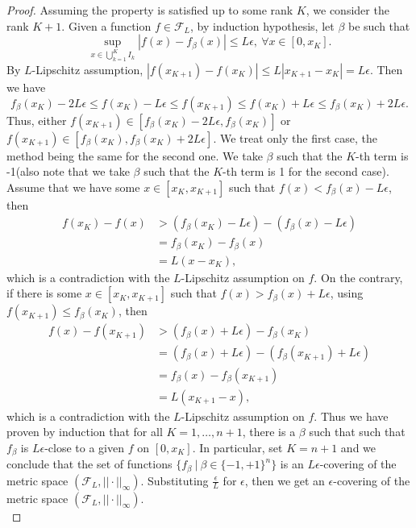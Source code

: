 \documentclass[11pt]{article}
\begin{document}
\begin{proof}
Assuming the property is satisfied up to some rank $K$, we consider the rank $K+1$. Given a function $f\in\mathcal{F}_L$, by induction hypothesis, let $\beta$ be such that
\[
\sup\limits_{x\in\bigcup\limits_{k=1}^{K}I_k}|f(x)-f_{\beta}(x)| \leq L\epsilon, \ \forall x\in[0,x_K].
\]
By $L$-Lipschitz assumption, $|f(x_{K+1})-f(x_K)|\leq L|x_{K+1}-x_K|= L\epsilon$. Then we have 
\[
f_{\beta}(x_K)-2L\epsilon \leq f(x_K)-L\epsilon \leq f(x_{K+1}) \leq f(x_K)+L\epsilon \leq f_{\beta}(x_K)+2L\epsilon.
\]
Thus, either $f(x_{K+1})\in[f_{\beta}(x_K)-2L\epsilon,f_{\beta}(x_K)]$ or $f(x_{K+1})\in[f_{\beta}(x_K),f_{\beta}(x_K)+2L\epsilon]$. We treat only the first case, the method being the same for the second one. We take $\beta$ such that the $K$-th term is -1(also note that we take $\beta$ such that the $K$-th term is 1 for the second case). Assume that we have some $x\in[x_K,x_{K+1}]$ such that $f(x)<f_{\beta}(x)-L\epsilon$, then
\begin{equation*}
    \begin{aligned}
        f(x_K)-f(x) & > (f_{\beta}(x_K)-L\epsilon)-(f_{\beta}(x)-L\epsilon) \\
                    & = f_{\beta}(x_K)-f_{\beta}(x) \\
                    & = L(x-x_K),
    \end{aligned}
\end{equation*}
which is a contradiction with the $L$-Lipschitz assumption on $f$. On the contrary, if there is some $x\in[x_K,x_{K+1}]$ such that $f(x)>f_{\beta}(x)+L\epsilon$, using $f(x_{K+1})\leq f_{\beta}(x_K)$, then
\begin{equation*}
    \begin{aligned}
        f(x)-f(x_{K+1}) & > (f_{\beta}(x)+L\epsilon)-f_{\beta}(x_K) \\
                        & = (f_{\beta}(x)+L\epsilon)-(f_{\beta}(x_{K+1})+L\epsilon) \\
                        & = f_{\beta}(x)-f_{\beta}(x_{K+1}) \\
                        & = L(x_{K+1}-x),
    \end{aligned}
\end{equation*}
which is a contradiction with the $L$-Lipschitz assumption on $f$. Thus we have proven by induction that for all $K=1,\dots,n+1$, there is a $\beta$ such that such that $f_{\beta}$ is $L\epsilon$-close to a given $f$ on $[0,x_K]$. In particular, set $K=n+1$ and we conclude that the set of functions $\{f_{\beta}\ |\ \beta\in\{-1,+1\}^n\}$ is an $L\epsilon$-covering of the metric space $(\mathcal{F}_L,||\cdot||_\infty)$. Substituting $\frac{\epsilon}{L}$ for $\epsilon$, then we get an $\epsilon$-covering of the metric space $(\mathcal{F}_L,||\cdot||_\infty)$.\\


\end{proof}
\end{document}
